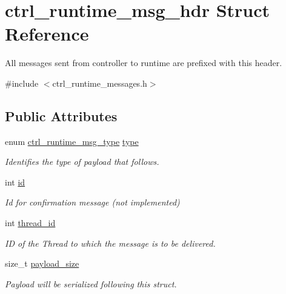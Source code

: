 \hypertarget{structctrl__runtime__msg__hdr}{\section{ctrl\-\_\-runtime\-\_\-msg\-\_\-hdr Struct Reference}
\label{structctrl__runtime__msg__hdr}
}


All messages sent from controller to runtime are prefixed with this header.  




{\ttfamily \#include $<$ctrl\-\_\-runtime\-\_\-messages.\-h$>$}

\subsection*{Public Attributes}
\begin{DoxyCompactItemize}
\item 
enum \hyperlink{ctrl__runtime__messages_8h_aff250b7918a6975b13277c84bc6ec5b9}{ctrl\-\_\-runtime\-\_\-msg\-\_\-type} \hyperlink{structctrl__runtime__msg__hdr_a765e6683d264c80a950d44f9e6936fcf}{type}
\begin{DoxyCompactList}\small\item\em Identifies the type of payload that follows. \end{DoxyCompactList}\item 
int \hyperlink{structctrl__runtime__msg__hdr_a108aad48b5396f75b3168a4f6d380b22}{id}
\begin{DoxyCompactList}\small\item\em Id for confirmation message (not implemented) \end{DoxyCompactList}\item 
int \hyperlink{structctrl__runtime__msg__hdr_a43dc841753e857ee2a825e3c253644df}{thread\-\_\-id}
\begin{DoxyCompactList}\small\item\em I\-D of the Thread to which the message is to be delivered. \end{DoxyCompactList}\item 
size\-\_\-t \hyperlink{structctrl__runtime__msg__hdr_a58295be6c498903d48cb6aa6cf651c01}{payload\-\_\-size}
\begin{DoxyCompactList}\small\item\em Payload will be serialized following this struct. \end{DoxyCompactList}\end{DoxyCompactItemize}


